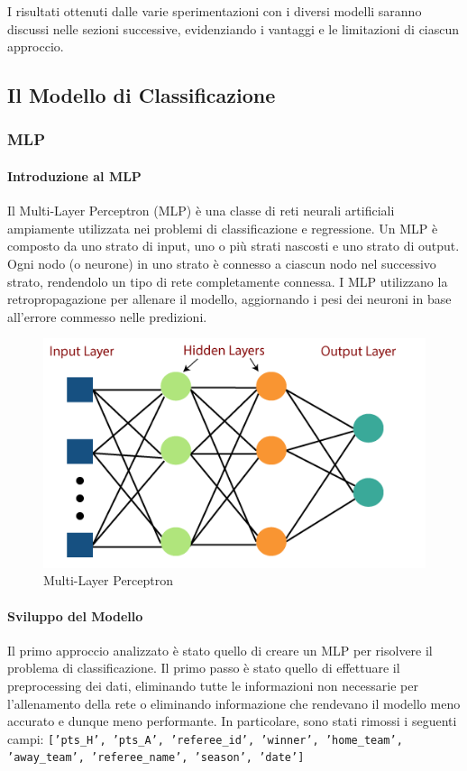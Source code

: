 \documentclass[a4paper]{article}
\numberwithin{equation}{section}
\begin{document}
I risultati ottenuti dalle varie sperimentazioni con i diversi modelli saranno discussi nelle sezioni successive, evidenziando i vantaggi e le limitazioni di ciascun approccio.

\subsection{Il Modello di Classificazione}

\subsubsection{MLP}

\paragraph{Introduzione al MLP}
Il Multi-Layer Perceptron (MLP) è una classe di reti neurali artificiali ampiamente utilizzata nei problemi di classificazione e regressione. Un MLP è composto da uno strato di input, uno o più strati nascosti e uno strato di output. Ogni nodo (o neurone) in uno strato è connesso a ciascun nodo nel successivo strato, rendendolo un tipo di rete completamente connessa. I MLP utilizzano la retropropagazione per allenare il modello, aggiornando i pesi dei neuroni in base all'errore commesso nelle predizioni.
\begin{figure}[H]
    \centering
    \includegraphics[width=0.3\linewidth]{img/multi-layer-perceptron-in-tensorflow.png}
    \caption{Multi-Layer Perceptron}
    \label{fig:enter-label}
\end{figure}

\paragraph{Sviluppo del Modello}
Il primo approccio analizzato è stato quello di creare un MLP per risolvere il problema di classificazione. Il primo passo è stato quello di effettuare il preprocessing dei dati, eliminando tutte le informazioni non necessarie per l'allenamento della rete o eliminando informazione che rendevano il modello meno accurato e dunque meno performante. In particolare, sono stati rimossi i seguenti campi: \newline
\texttt{['pts\_H', 'pts\_A', 'referee\_id', 'winner', 'home\_team', 'away\_team', 'referee\_name', \newline
'season', 'date']}
\end{document}
